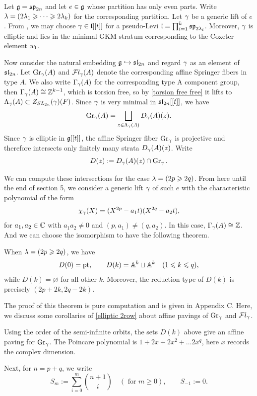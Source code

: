 \documentclass[11pt]{article}
\numberwithin{equation}{section}
\begin{document}
Let $\mathfrak{g}=\mathfrak{sp}_{2n}$ and let $e\in\mathfrak{g}$ whose partition has only even parts. Write $\lambda= (2\lambda_1\geqslant\cdots\geqslant2\lambda_k)$ for the corresponding partition. Let $\gamma$ be a generic lift of $e$. From \cite{Spaltenstein1988PolynomialsLocalFields}, we may choose $\gamma\in\mathfrak{l}[[t]]$ for a pseudo-Levi $\mathfrak{l}=\prod_{i=1}^{k}\mathfrak{sp}_{2\lambda_i}$. Moreover, $\gamma$ is elliptic and lies in the minimal GKM stratum corresponding to the Coxeter element $w_{\mathfrak{l}}$.

Now consider the natural embedding $\mathfrak{g}\hookrightarrow \mathfrak{sl}_{2n}$ and regard $\gamma$ as an element of $\mathfrak{sl}_{2n}$. Let $\operatorname{Gr}_\gamma(A)$ and $\mathcal{F}l_\gamma(A)$ denote the corresponding affine Springer fibers in type $A$. We also write $\Gamma_\gamma(A)$ for the corresponding type A component group, then
$\Gamma_\gamma(A)\cong \mathbb{Z}^{k-1}$, which is torsion free, so by
\cref{torsion free free} it lifts to $\Lambda_\gamma(A)\subset Z_{SL_{2n}}(\gamma)(F)$. Since $\gamma$ is very minimal in $\mathfrak{sl}_{2n}[[t]]$, we have
\[
\operatorname{Gr}_\gamma(A)
=
\bigsqcup_{z\in\Lambda_\gamma(A)}
D_\gamma(A)(z).
\]
Since $\gamma$ is elliptic in $\mathfrak{g}[[t]]$, the affine Springer fiber $\operatorname{Gr}_\gamma$ is projective and therefore intersects only finitely many strata $D_\gamma(A)(z)$. Write
\[
D(z):=D_\gamma(A)(z)\cap \operatorname{Gr}_\gamma.
\]

We can compute these intersections for the case $\lambda=(2p\geqslant 2q)$. From here until the end of section 5, we consider a generic lift $\gamma$ of such $e$  with the characteristic polynomial of the form $$\chi_\gamma(X)= (X^{2p}-a_1t)(X^{2q}-a_2t),$$ for $a_1,a_2\in \mathbb{C}$ with $a_1a_2\neq 0$ and $(p,a_1)\neq (q,a_2)$. In this case, $\Gamma_\gamma(A)\cong \mathbb{Z}$. And we can choose the isomorphism to have the following theorem.
\begin{thm} \label{elliptic 2row}
    When $\lambda=(2p\geqslant 2q)$, we have
\[
D(0)=\operatorname{pt},\qquad
D(k)=\mathbb{A}^k\sqcup\mathbb{A}^k\quad (1\leqslant k\leqslant q),
\]
while $D(k)=\varnothing$ for all other $k$. Moreover, the reduction type of $D(k)$ is precisely $(2p+2k,2q-2k)$.
\end{thm}
The proof of this theorem is pure computation and is given in Appendix C. Here, we discuss some corollaries of \cref{elliptic 2row} about affine pavings of $\operatorname{Gr}_\gamma$ and $\mathcal{F}l_\gamma$.
\begin{cor}
    Using the order of the semi-infinite orbits, the sets $D(k)$ above give an affine paving for $\operatorname{Gr}_\gamma$. The Poincare polynomial is $1+ 2x +2x^2+\dots 2x^q$, here $x$ records the complex dimension.
\end{cor}
Next, for
$n=p+q$, we write
\[
S_m:=\sum_{i=0}^{m}\binom{n+1}{i}\quad(\text{ for } m\geqslant 0),\qquad S_{-1}:=0 .
\]
\end{document}
